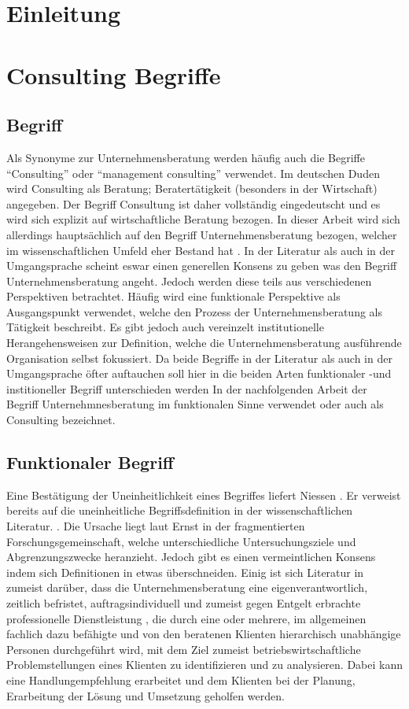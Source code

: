 \chapter{Einleitung}
\chapter{Consulting Begriffe}
\section{Begriff}
Als Synonyme zur Unternehmensberatung werden häufig auch die Begriffe “Consulting”
oder “management consulting” verwendet. Im deutschen Duden wird Consulting als Beratung; Beratertätigkeit (besonders in der Wirtschaft) angegeben. Der Begriff Consultung ist daher vollständig eingedeutscht und es wird sich explizit auf wirtschaftliche Beratung bezogen. 
In dieser Arbeit wird sich allerdings hauptsächlich auf den Begriff Unternehmensberatung bezogen, welcher im wissenschaftlichen Umfeld eher Bestand hat .
In der Literatur als auch in der Umgangsprache scheint eswar einen generellen Konsens zu geben was den Begriff Unternehmensberatung angeht. 
Jedoch werden diese teils aus verschiedenen Perspektiven betrachtet. Häufig wird eine funktionale Perspektive als Ausgangspunkt verwendet, welche den Prozess der Unternehmensberatung als Tätigkeit beschreibt. Es gibt jedoch auch vereinzelt institutionelle Herangehensweisen zur Definition, welche die Unternehmensberatung ausführende Organisation selbst fokussiert. Da beide Begriffe in der Literatur als auch in der Umgangsprache öfter auftauchen soll hier in die beiden Arten funktionaler -und institioneller Begriff unterschieden werden In der nachfolgenden Arbeit der Begriff Unternehmnesberatung im funktionalen Sinne verwendet oder auch als Consulting bezeichnet.

\section{Funktionaler Begriff}

Eine Bestätigung der Uneinheitlichkeit eines Begriffes liefert Niessen \cite[10]{nissen2007consulting}. Er verweist bereits auf die uneinheitliche Begriffsdefinition in der wissenschaftlichen Literatur. \cite[7]{ernst2002evaluation}. Die Ursache liegt laut Ernst \cite[10]{ernst2002evaluation} in der fragmentierten Forschungsgemeinschaft, welche unterschiedliche Untersuchungsziele und Abgrenzungszwecke heranzieht. 
Jedoch gibt es einen vermeintlichen Konsens indem sich Definitionen in etwas überschneiden. Einig ist sich Literatur in  zumeist darüber, dass die Unternehmensberatung eine eigenverantwortlich, zeitlich befristet, auftragsindividuell und zumeist gegen Entgelt erbrachte professionelle Dienstleistung \cite[14]{Lippold201309}, die durch eine oder mehrere, im allgemeinen fachlich dazu befähigte und von den beratenen Klienten hierarchisch unabhängige Personen durchgeführt wird, mit dem Ziel zumeist betriebswirtschaftliche Problemstellungen eines Klienten zu identifizieren und zu analysieren. Dabei kann eine Handlungempfehlung erarbeitet und dem Klienten bei der Planung, Erarbeitung der Lösung und Umsetzung geholfen werden.  \cite[15]{nissen2007consulting}


